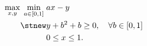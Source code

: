 

                                                   





\begin{align}\label{p4c3:illustexample}
\max_{x,y}\;\min_{a\in [0,1]}\; & ax - y\\
\stnew & y + b^2 + b \geq 0, \quad \forall b\in[0,1] \\
& 0\leq x \leq 1.
\end{align}
